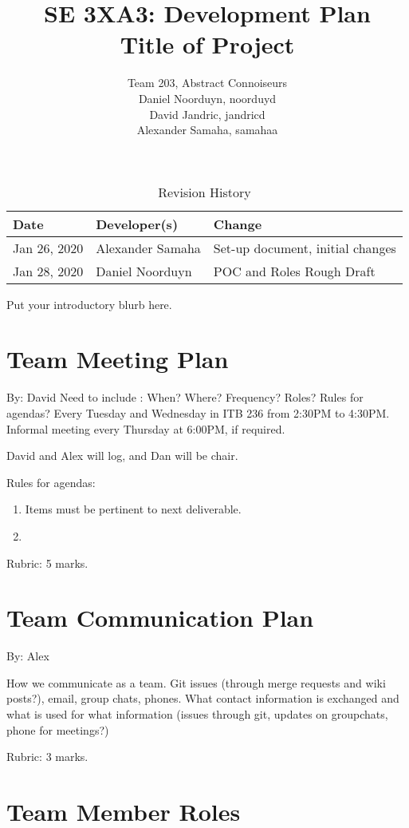 \documentclass{article}
\title{SE 3XA3: Development Plan\\Title of Project}
\author{Team 203, Abstract Connoiseurs\\
Daniel Noorduyn, noorduyd\\
David Jandric, jandricd\\
Alexander Samaha, samahaa\\
}
\date{}
\begin{document}
\begin{table}[hp]
\caption{Revision History} \label{TblRevisionHistory}
\begin{tabularx}{\textwidth}{llX}
\toprule
\textbf{Date} & \textbf{Developer(s)} & \textbf{Change}\\
\midrule
Jan 26, 2020 & Alexander Samaha & Set-up document, initial changes\\
Jan 28, 2020 & Daniel Noorduyn & POC and Roles Rough Draft\\
\bottomrule
\end{tabularx}
\end{table}

\newpage

\maketitle

Put your introductory blurb here.

\section{Team Meeting Plan}

By: David
Need to include :  When?  Where?  Frequency?  Roles?  Rules for agendas?
Every Tuesday and Wednesday in ITB 236 from 2:30PM to 4:30PM.
Informal meeting every Thursday at 6:00PM, if required.

David and Alex will log, and Dan will be chair.

Rules for agendas:
\begin{enumerate}
    \item Items must be pertinent to next deliverable.
    \item
\end{enumerate}


Rubric:  5 marks.

\section{Team Communication Plan}
By: Alex

How we communicate as a team.  Git issues (through merge requests and wiki
posts?), email, group chats, phones.  What contact information is exchanged and
what is used for what information (issues through git,  updates on groupchats,
phone for meetings?)

Rubric:  3 marks.

\section{Team Member Roles}
%
\end{document}
